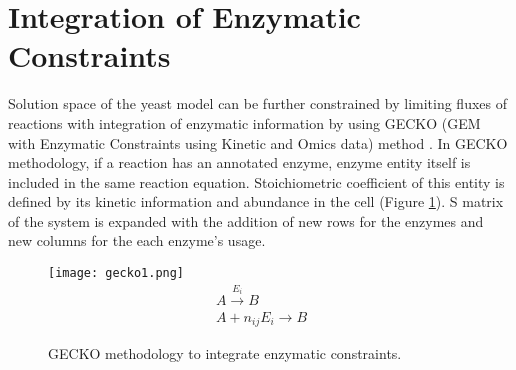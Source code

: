 \section{Integration of Enzymatic Constraints}

Solution space of the yeast model can be further constrained by limiting fluxes of reactions with integration of enzymatic information by using GECKO (GEM with Enzymatic Constraints using Kinetic and Omics data) method \cite{sanchez2017improving}.  In GECKO methodology, if a reaction has an annotated enzyme, enzyme entity itself is included in the same reaction equation. Stoichiometric coefficient of this entity is defined by its kinetic information and abundance in the cell (Figure \ref{fig:gecko1}). S matrix of the system is expanded with the addition of new rows for the enzymes and new columns for the each enzyme's usage.

\begin{figure}[H]
\begin{center}
\texttt{[image: gecko1.png]}
\begin{align}
\label{eq:geckoreaction}
 \ A \xrightarrow{E_i} B \\
 \label{eq:gecko}
 \ A + n_{ij}E_i \xrightarrow{} B
\end{align}
\end{center}
\caption[GECKO methodology to integrate enzymatic constraints]{GECKO methodology to integrate enzymatic constraints.}
\label{fig:gecko1}
\end{figure}

